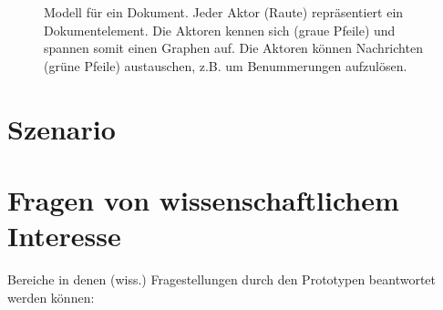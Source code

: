 \begin{figure}[h!]
\centering
\advance\leftskip-2.5cm
\caption{ Modell für ein Dokument. Jeder Aktor (Raute) repräsentiert ein Dokumentelement. Die Aktoren kennen sich (graue Pfeile) und spannen somit einen Graphen auf. Die Aktoren können Nachrichten (grüne Pfeile) austauschen, z.B. um Benummerungen aufzulösen. }\label{idee}
\end{figure}
 
\section{Szenario}\label{}
 
\section{Fragen von wissenschaftlichem Interesse}\label{}
 
Bereiche in denen (wiss.) Fragestellungen durch den Prototypen beantwortet werden können:

